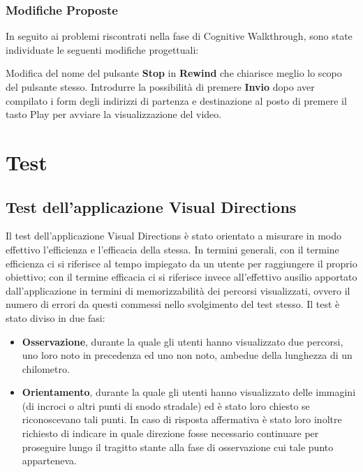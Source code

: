 \documentclass[12pt,a4paper,openright, notitlepage]{report}
\begin{document}
\subsection{Modifiche Proposte}

In seguito ai problemi riscontrati nella fase di Cognitive Walkthrough, sono state individuate le seguenti modifiche progettuali:

Modifica del nome del pulsante \textbf{Stop} in \textbf{Rewind} che chiarisce meglio lo scopo del pulsante stesso.
Introdurre la possibilità di premere \textbf{Invio} dopo aver compilato i form degli indirizzi di partenza e destinazione al posto di premere il tasto Play per avviare la visualizzazione del video.



\chapter{Test}

\section{Test dell’applicazione Visual Directions}

Il test dell’applicazione Visual Directions è stato orientato a misurare in modo effettivo l’efficienza e l’efficacia della stessa. In termini generali, con il termine efficienza ci si riferisce al tempo impiegato da un utente per raggiungere il proprio obiettivo; con il termine efficacia ci si riferisce invece all’effettivo ausilio apportato dall’applicazione in termini di memorizzabilità dei percorsi visualizzati, ovvero il numero di errori da questi commessi nello svolgimento del test stesso. Il test è stato diviso in due fasi:

\begin{itemize}
	\item \textbf{Osservazione}, durante la quale gli utenti hanno visualizzato due percorsi, uno loro noto in precedenza ed uno non noto, ambedue della lunghezza di un chilometro.
	\item \textbf{Orientamento}, durante la quale gli utenti hanno visualizzato delle immagini (di incroci o altri punti di snodo stradale) ed è stato loro chiesto se riconoscevano tali punti. In caso di risposta affermativa è stato loro inoltre richiesto di indicare in quale direzione fosse necessario continuare per proseguire lungo il tragitto stante alla fase di osservazione cui tale punto apparteneva.
\end{itemize}
\end{document}
